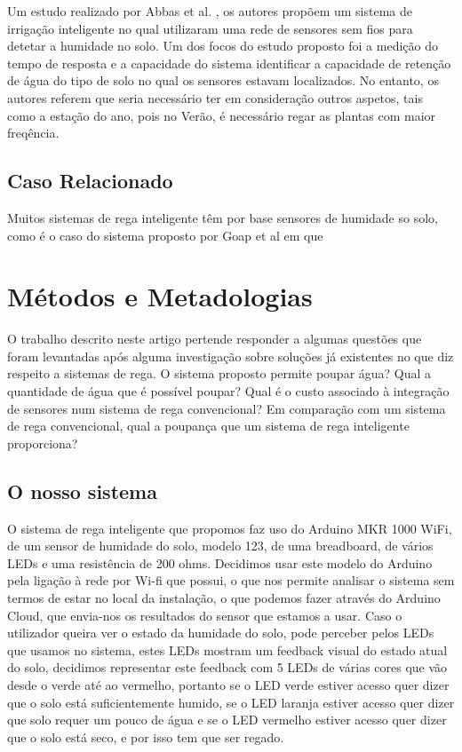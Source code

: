 \documentclass[conference]{IEEEtran}
\begin{document}
Um estudo realizado por Abbas et al. \cite{abbas2014smart}, os autores propõem um sistema de irrigação inteligente
no qual utilizaram uma rede de sensores sem fios para detetar a humidade no solo. Um dos focos do estudo proposto 
foi a medição do tempo de resposta e a capacidade do sistema identificar a capacidade de retenção de água do tipo 
de solo no qual os sensores estavam localizados. No entanto, os autores referem que seria necessário ter em 
consideração outros aspetos, tais como a estação do ano, pois no Verão, é necessário regar as plantas
 com maior freqência.

\subsection{Caso Relacionado}

Muitos sistemas de rega inteligente têm por base sensores de humidade so solo, como 
é o caso do sistema proposto por Goap et al \cite{goap2018an} em que 

\section{Métodos e Metadologias}
O trabalho descrito neste artigo pertende responder a algumas questões que foram 
levantadas após alguma investigação sobre soluções já existentes no que diz respeito 
a sistemas de rega. O sistema proposto permite poupar água? Qual a quantidade de água 
que é possível poupar?  Qual é o custo associado à integração de sensores num sistema 
de rega convencional? Em comparação com um sistema de rega convencional, 
qual a poupança que um sistema de rega inteligente proporciona?

\subsection{O nosso sistema}

O sistema de rega inteligente que propomos faz uso do Arduino MKR 1000 WiFi, de um sensor de 
humidade do solo, modelo 123, de uma breadboard, de vários LEDs e uma resistência de 200 ohms. 
Decidimos usar este modelo do Arduino pela ligação à rede por Wi-fi que possui, o que nos 
permite analisar o sistema sem termos de estar no local da instalação, o que podemos fazer através do 
Arduino Cloud, que envia-nos os resultados do sensor que estamos a usar. Caso o utilizador 
queira ver o estado da humidade do solo, pode perceber pelos LEDs que usamos no sistema, estes 
LEDs mostram um feedback visual do estado atual do solo, decidimos representar este 
feedback com 5 LEDs de várias cores que vão desde o verde até ao vermelho, portanto 
se o LED verde estiver acesso quer dizer que o solo está suficientemente humido, se 
o LED laranja estiver acesso quer dizer que solo requer um pouco de água e se o LED
vermelho estiver acesso quer dizer que o solo está seco, e por isso tem que ser regado.
\end{document}
